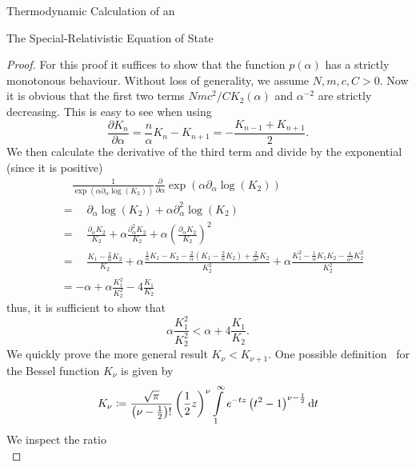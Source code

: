 \begin{section}{Thermodynamic Calculation of an \texorpdfstring{}{EoS}}
\begin{subsection}{The Special-Relativistic Equation of State}
\begin{proof}
	For this proof it suffices to show that the function $p(\alpha)$ has a strictly monotonous behaviour.
	Without loss of generality, we assume $N,m,c,C>0$.
	Now it is obvious that the first two terms $Nmc^2/CK_2(\alpha)$ and $\alpha^{-2}$ are strictly decreasing.
	This is easy to see when using~\cite{abramowitzPocketbookMathematicalFunctions1984}
	\begin{equation}
		\frac{\partial K_n}{\partial\alpha} = \frac{n}{\alpha}K_n-K_{n+1} = -\frac{K_{n-1}+K_{n+1}}{2}.
		\label{eq:2-IntEner-BesselDerivative}
	\end{equation}
	We then calculate the derivative of the third term and divide by the exponential (since it is positive)
	\begin{align}
		&\hspace{1em} \frac{1}{\exp(\alpha\partial_\alpha\log(K_2))}\frac{\partial}{\partial\alpha}\exp(\alpha\partial_\alpha\log(K_2))\\
		&= \hspace{1em} \partial_\alpha\log(K_2) + \alpha\partial^2_\alpha\log(K_2)\\
		&= \hspace{1em} \frac{\partial_\alpha K_2}{K_2} + \alpha\frac{\partial^2_\alpha K_2}{K_2} + \alpha\left(\frac{\partial_\alpha K_2}{K_2}\right)^2\\
		&= \hspace{1em} \frac{K_1-\frac{2}{\alpha}K_2}{K_2} + \alpha\frac{\frac{1}{\alpha}K_1-K_2-\frac{2}{\alpha}\left(K_1-\frac{2}{\alpha}K_2\right)+\frac{2}{\alpha^2}K_2}{K_2^2} + \alpha\frac{K_1^2-\frac{1}{\alpha}K_1 K_2-\frac{4}{\alpha^2}K_2^2}{K_2^2}\\
		&= -\alpha + \alpha\frac{K_1^2}{K_2^2} - 4\frac{K_1}{K_2}
	\end{align}
	thus, it is sufficient to show that
	\begin{equation}
		\alpha\frac{K_1^2}{K_2^2}  < \alpha + 4\frac{K_1}{K_2}.
		\label{eq:2-IntEner-BesselK-Ineq-K1-over-K2}
	\end{equation}
	We quickly prove the more general result $K_\nu<K_{\nu+1}$.
	One possible definition~\cite{abramowitzPocketbookMathematicalFunctions1984} for the Bessel function $K_\nu$ is given by
	\begin{equation}
		K_\nu \coloneqq \frac{\sqrt{\pi}}{\left(\nu-\frac{1}{2}\right)!}\left(\frac{1}{2}z\right)^\nu\int\limits_1^\infty\mathit{e}^{-tz}\left(t^2-1\right)^{\nu-\frac{1}{2}}\mathop{}\!\mathrm{d} t
		\label{eq:2-IntEner-BesselK-Def}
	\end{equation}
	We inspect the ratio
	\begin{equation}

\end{equation}
\end{proof}
\end{subsection}
\end{section}
